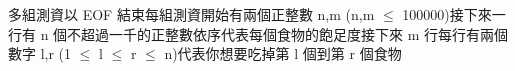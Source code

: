 多組測資以 EOF 結束每組測資開始有兩個正整數 n,m (n,m $\leq$ 100000)接下來一行有 n 個不超過一千的正整數依序代表每個食物的飽足度接下來 m 行每行有兩個數字 l,r (1 $\leq$ l $\leq$ r $\leq$ n)代表你想要吃掉第 l 個到第 r 個食物